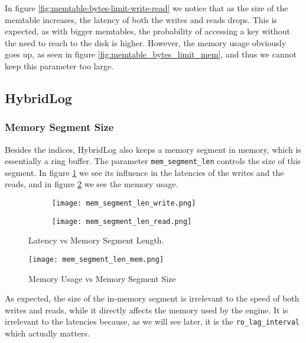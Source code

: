In figure \ref{fig:memtable-bytes-limit-write-read} we notice that as the size of the memtable increases, the latency of both the writes and reads drops. This is expected, as with bigger memtables, the probability of accessing a key without the need to reach to the disk is higher. However, the memory usage obviously goes up, as seen in figure \ref{fig:memtable_bytes_limit_mem}, and thus we cannot keep this parameter too large.

\subsection{HybridLog}

\subsubsection{Memory Segment Size}

Besides the indices, HybridLog also keeps a memory segment in memory, which is essentially a ring buffer. The parameter \verb"mem_segment_len" controls the size of this segment. In figure \ref{fig:mem_segment_len_write_read} we see its influence in the latencies of the writes and the reads, and in figure \ref{fig:mem_segment_len_mem.png} we see the memory usage.

\begin{figure}[h]
    \begin{subfigure}{.5\textwidth}
        \centering
        \texttt{[image: mem\_segment\_len\_write.png]}
    \end{subfigure}
    \begin{subfigure}{.5\textwidth}
        \centering
        \texttt{[image: mem\_segment\_len\_read.png]}
    \end{subfigure}
    \caption{Latency vs Memory Segment Length.}
    \label{fig:mem_segment_len_write_read}
\end{figure}


\begin{figure}[h]
    \centering
    \texttt{[image: mem\_segment\_len\_mem.png]}
    \caption{Memory Usage vs Memory Segment Size}
    \label{fig:mem_segment_len_mem.png}
\end{figure}

As expected, the size of the in-memory segment is irrelevant to the speed of both writes and reads, while it directly affects the memory used by the engine. It is irrelevant to the latencies because, as we will see later, it is the \verb"ro_lag_interval" which actually matters.

